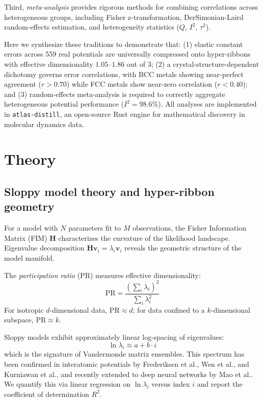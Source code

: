 \documentclass[twocolumn,9pt]{extarticle}
\begin{document}
Third, \textit{meta-analysis} provides rigorous methods for combining correlations across heterogeneous groups, including Fisher z-transformation, DerSimonian-Laird random-effects estimation, and heterogeneity statistics ($Q$, $I^2$, $\tau^2$)\cite{hedges1985,borenstein2009,borenstein2010,dersimonian1986,higgins2003}.

Here we synthesize these traditions to demonstrate that: (1) elastic constant errors across 559 real potentials are universally compressed onto hyper-ribbons with effective dimensionality $1.05$--$1.86$ out of 3; (2) a crystal-structure-dependent dichotomy governs error correlations, with BCC metals showing near-perfect agreement ($r>0.70$) while FCC metals show near-zero correlation ($r<0.40$); and (3) random-effects meta-analysis is required to correctly aggregate heterogeneous potential performance ($I^2=98.6\%$). All analyses are implemented in \texttt{atlas-distill}, an open-source Rust engine for mathematical discovery in molecular dynamics data.

\section{Theory}

\subsection{Sloppy model theory and hyper-ribbon geometry}

For a model with $N$ parameters fit to $M$ observations, the Fisher Information Matrix (FIM) $\mathbf{H}$ characterizes the curvature of the likelihood landscape. Eigenvalue decomposition $\mathbf{H}\mathbf{v}_i = \lambda_i \mathbf{v}_i$ reveals the geometric structure of the model manifold.

The \textit{participation ratio} (PR) measures effective dimensionality:
\begin{equation}
\text{PR} = \frac{(\sum_i \lambda_i)^2}{\sum_i \lambda_i^2}
\end{equation}
For isotropic $d$-dimensional data, $\text{PR} \approx d$; for data confined to a $k$-dimensional subspace, $\text{PR} \approx k$.

Sloppy models exhibit approximately linear log-spacing of eigenvalues:
\begin{equation}
\ln \lambda_i \approx a + b \cdot i
\end{equation}
which is the signature of Vandermonde matrix ensembles\cite{waterfall2006}. This spectrum has been confirmed in interatomic potentials by Frederiksen et al.\cite{frederiksen2004}, Wen et al.\cite{wen2017}, and Kurniawan et al.\cite{kurniawan2022}, and recently extended to deep neural networks by Mao et al.\cite{mao2024,mao2026}. We quantify this via linear regression on $\ln \lambda_i$ versus index $i$ and report the coefficient of determination $R^2$.
\end{document}
